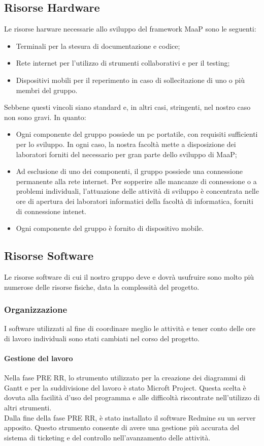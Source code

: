 \subsection{Risorse Hardware}
Le risorse harware necessarie allo sviluppo del framework MaaP sono le seguenti:
\begin{itemize}
\item Terminali per la stesura di documentazione e codice;
\item Rete internet per l'utilizzo di strumenti collaborativi e per il testing;
\item Dispositivi mobili per il reperimento in caso di sollecitazione di uno o più membri del gruppo.
\end{itemize}
Sebbene questi vincoli siano standard e, in altri casi, stringenti, nel nostro caso non sono gravi. In quanto:
\begin{itemize}
\item Ogni componente del gruppo possiede un pc portatile, con requisiti sufficienti per lo sviluppo. In ogni caso, la nostra facoltà mette a disposizione dei laboratori forniti del necessario per gran parte dello sviluppo di MaaP;
\item Ad esclusione di uno dei componenti, il gruppo possiede una connessione permanente alla rete internet. Per sopperire alle mancanze di connessione o a problemi individuali, l'attuazione delle attività di sviluppo è concentrata nelle ore di apertura dei laboratori informatici della facoltà di informatica, forniti di connessione intenet.
\item Ogni componente del gruppo è fornito di dispositivo mobile. 
\end{itemize}

\subsection{Risorse Software}
Le risorse software di cui il nostro gruppo deve e dovrà usufruire sono molto più numerose delle risorse fisiche, data la complessità del progetto. 
\subsubsection{Organizzazione}
I software utilizzati al fine di coordinare meglio le attività e tener conto delle ore di lavoro individuali sono stati cambiati nel corso del progetto.\\
\paragraph{Gestione del lavoro}
Nella fase PRE RR, lo strumento utilizzato per la creazione dei diagrammi di Gantt e per la suddivisione del lavoro è stato Microft Project. Questa scelta è dovuta alla facilità d'uso del programma e alle difficoltà riscontrate nell'utilizzo di altri strumenti.\\
Dalla fine della fase PRE RR, è stato installato il software Redmine su un server apposito. Questo strumento consente di avere una gestione più accurata del sistema di ticketing e del controllo nell'avanzamento delle attività.
